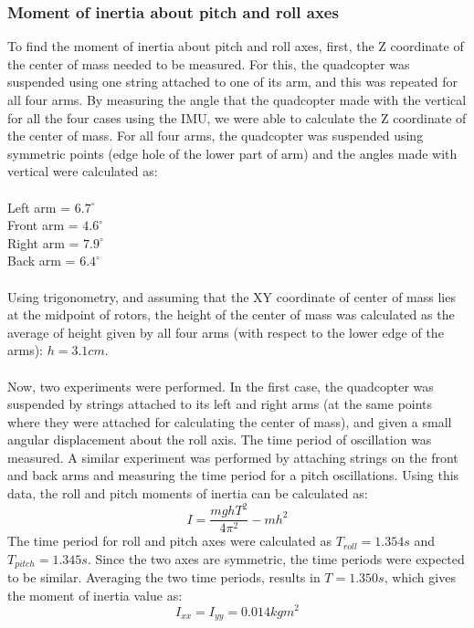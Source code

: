 \documentclass{article}
\begin{document}
\subsubsection{Moment of inertia about pitch and roll axes}
To find the moment of inertia about pitch and roll axes, first, the Z coordinate of the center of mass needed to be measured. For this, the quadcopter was suspended using one string attached to one of its arm, and this was repeated for all four arms. By measuring the angle that the quadcopter made with the vertical for all the four cases using the IMU, we were able to calculate the Z coordinate of the center of mass. For all four arms, the quadcopter was suspended using symmetric points (edge hole of the lower part of arm) and the angles made with vertical were calculated as:\\\\
Left arm = $6.7^{\circ}$\\
Front arm = $4.6^{\circ}$\\
Right arm = $7.9^{\circ}$\\
Back arm = $6.4^{\circ}$\\\\
Using trigonometry, and assuming that the XY coordinate of center of mass lies at the midpoint of rotors, the height of the center of mass was calculated as the average of height given by all four arms (with respect to the lower edge of the arms):
$h = 3.1 cm$. \\\\
Now, two experiments were performed. In the first case, the quadcopter was suspended by strings attached to its left and right arms (at the same points where they were attached for calculating the center of mass), and given a small angular displacement about the roll axis. The time period of oscillation was measured. A similar experiment was performed by attaching strings on the front and back arms and measuring the time period for a pitch oscillations. Using this data, the roll and pitch moments of inertia can be calculated as:
\begin{equation}
I = \frac{mghT^2}{4\pi^2}-mh^2
\end{equation} 
The time period for roll and pitch axes were calculated as $T_{roll} = 1.354 s$ and $T_{pitch} = 1.345 s$. Since the two axes are symmetric, the time periods were expected to be similar. Averaging the two time periods, results in $T = 1.350 s$, which gives the moment of inertia value as:
\begin{equation}
I_{xx} = I_{yy} = 0.014 kg m^2
\end{equation}
\end{document}
